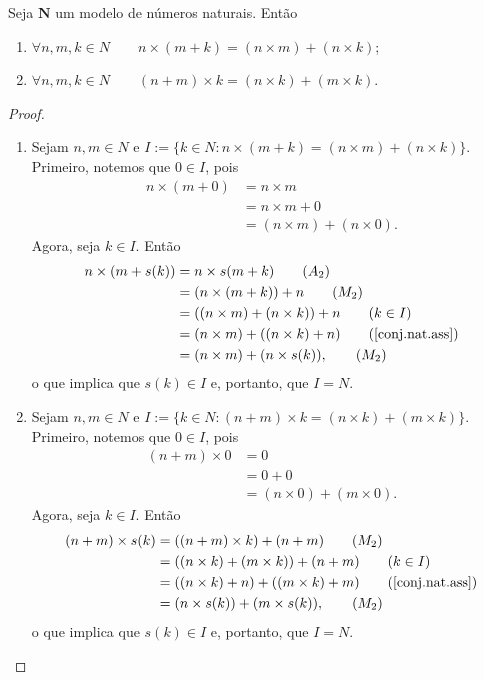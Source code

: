 \begin{teo}[Distributividade] \label{conj.nat.dist}
	Seja $\bm N$ um modelo de números naturais. Então
	\begin{enumerate}
	\item $\forall n,m,k \in N \qquad n \times (m+k) = (n \times m) + (n \times k)$;
	\item $\forall n,m,k \in N \qquad (n + m) \times k = (n \times k) + (m \times k)$.
	\end{enumerate}
\end{teo}
\begin{proof}
	\begin{enumerate}
	\item Sejam $n,m \in N$ e $I := \{k \in N:n \times (m+k) = (n \times m) + (n \times k)\}$. Primeiro, notemos que $0 \in I$, pois
	\begin{align*}
	n \times (m+0) &= n \times m 								\tag{$A_1$} \\
		&= n \times m  + 0 											\tag{$A_1$} \\
		&= (n \times m) + (n \times 0).							\tag{$M_1$}
	\end{align*}
Agora, seja $k \in I$. Então
	\begin{align*}
	n \times (m+s(k)) &= n \times s(m+k) 					\tag{$A_2$}\\
		&= (n \times (m+k)) + n 									\tag{$M_2$}\\
		&= ((n \times m) + (n \times k)) + n					\tag{$k \in I$} \\
		&= (n \times m) + ((n \times k) + n)				 	\tag{$\ref{conj.nat.ass}$} \\
		&= (n \times m) + (n \times s(k)),						\tag{$M_2$}
	\end{align*}
o que implica que $s(k) \in I$ e, portanto, que $I=N$.

	\item Sejam $n,m \in N$ e $I := \{k \in N:(n + m) \times k = (n \times k) + (m \times k)\}$. Primeiro, notemos que $0 \in I$, pois
	\begin{align*}
	(n + m) \times 0 &= 0 											\tag{$M_1$} \\
		&= 0 + 0															\tag{$A_1$} \\
		&= (n \times 0) + (m \times 0).							\tag{$M_1$}
	\end{align*}
Agora, seja $k \in I$. Então	
	\begin{align*}
	(n + m) \times s(k) &= ((n+m) \times k) + (n+m)	\tag{$M_2$}\\
		&= ((n \times k) + (m \times k)) + (n+m)			\tag{$k \in I$}\\
		&= ((n \times k)+n) + ((m \times k)+m)			\tag{\ref{conj.nat.ass}} \\
		&= (n \times s(k)) + (m \times s(k)),				 	\tag{$M_2$}
	\end{align*}
o que implica que $s(k) \in I$ e, portanto, que $I=N$.
	\end{enumerate}
\end{proof}

